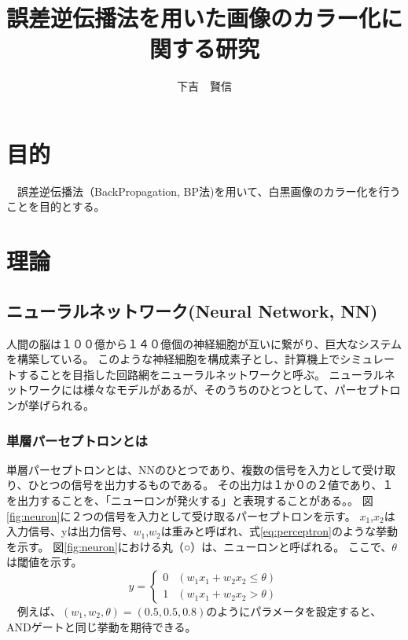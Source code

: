 \documentclass[twocolumn,fleqn]{jsarticle}
\begin{document}
\title{誤差逆伝播法を用いた画像のカラー化に関する研究}
\author{下吉　賢信}
\maketitle 

\section{目的}
　誤差逆伝播法（BackPropagation, BP法)を用いて、白黒画像のカラー化を行うことを目的とする。

\section{理論}
\subsection{ニューラルネットワーク(Neural Network, NN)}
人間の脳は１００億から１４０億個の神経細胞が互いに繋がり、巨大なシステムを構築している。
このような神経細胞を構成素子とし、計算機上でシミュレートすることを目指した回路網をニューラルネットワークと呼ぶ。
ニューラルネットワークには様々なモデルがあるが、そのうちのひとつとして、パーセプトロンが挙げられる。
\subsubsection{単層パーセプトロンとは}
単層パーセプトロンとは、NNのひとつであり、複数の信号を入力として受け取り、ひとつの信号を出力するものである。
その出力は１か０の２値であり、１を出力することを、「ニューロンが発火する」と表現することがある。。
図\ref{fig:neuron}に２つの信号を入力として受け取るパーセプトロンを示す。
$x_1$,$x_2$は入力信号、yは出力信号、$w_1$,$w_2$は重みと呼ばれ、式\ref{eq:perceptron}のような挙動を示す。
図\ref{fig:neuron}における丸（○）は、ニューロンと呼ばれる。
ここで、$\theta$は閾値を示す。\\
\begin{equation}
        y = \begin{cases}
            0 & (w_1x_1 + w_2x_2 \leq \theta) \\
            1 & (w_1x_1 + w_2x_2 > \theta)
        \end{cases}
        \label{eq:perceptron}
\end{equation}
　例えば、$(w_1,w_2,\theta) = (0.5, 0.5, 0.8)$のようにパラメータを設定すると、ANDゲートと同じ挙動を期待できる。
\end{document}

